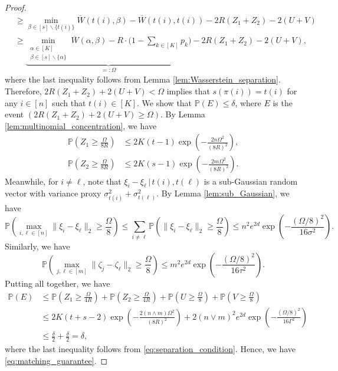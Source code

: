 \documentclass[11pt,letterpaper]{article}
\theoremstyle{definition}
\numberwithin{equation}{section}
\renewcommand{\P}{\mathbb{P}}
\begin{document}
\begin{proof}
\begin{equation}
\begin{split}
            & \ge \min_{\beta \in [s] \backslash \{t(i)\}} \overline{W}(t(i), \beta) - \overline{W}(t(i), t(i)) - 2 R (Z_1 + Z_2) - 2 (U + V) \\
            & \ge \underbrace{\min_{\substack{\alpha \in [K] \\ \beta \in [s] \backslash \{\alpha\}}} \overline{W}(\alpha, \beta) - R \cdot \bigg(1 - \sum_{k \in [K]} p_k \bigg)}_{=: \Omega} - 2 R (Z_1 + Z_2) - 2 (U + V),
        \end{split}
    \end{equation}
    where the last inequality follows from Lemma \ref{lem:Wasserstein_separation}. Therefore, $2 R (Z_1 + Z_2) + 2 (U + V) < \Omega$ implies that $s(\pi(i)) = t(i)$ for any $i \in [n]$ such that $t(i) \in [K]$. We show that $\P(E) \le \delta$, where $E$ is the event $(2 R (Z_1 + Z_2) + 2 (U + V) \ge \Omega)$. By Lemma \ref{lem:multinomial_concentration}, we have 
    \begin{align*}
        \P\left(Z_1 \ge \frac{\Omega}{8 R}\right) & \le 2 K (t - 1) \exp\left(-\frac{2 n \Omega^2}{(8 R)^2}\right), \\
        \P\left(Z_2 \ge \frac{\Omega}{8 R}\right) & \le 2 K (s - 1) \exp\left(-\frac{2 m \Omega^2}{(8 R)^2}\right).
    \end{align*}
    Meanwhile, for $i \neq \ell$, note that $\xi_i - \xi_\ell \, | \, t(i), t(\ell)$ is a sub-Gaussian random vector with variance proxy $\sigma_{t(i)}^2 + \sigma_{t(\ell)}^2$. By Lemma \ref{lem:sub_Gaussian}, we have
    \begin{equation*}
        \P\left(\max_{i, \ell \in [n]} \|\xi_i - \xi_\ell\|_2 \ge \frac{\Omega}{8}\right) \le \sum_{i \neq \ell} \P\left(\|\xi_i - \xi_\ell\|_2 \ge \frac{\Omega}{8}\right) \le n^2 e^{2 d} \exp\left(-\frac{(\Omega / 8)^2}{16 \sigma^2}\right).
    \end{equation*}
    Similarly, we have
    \begin{equation*}
        \P\left(\max_{j, \ell \in [m]} \|\zeta_j - \zeta_\ell\|_2 \ge \frac{\Omega}{8}\right) \le m^2 e^{2 d} \exp\left(-\frac{(\Omega / 8)^2}{16 \tau^2}\right). 
    \end{equation*}
    Putting all together, we have
    \begin{equation*}
        \begin{split}
            \P(E) 
            & \le \P\left(Z_1 \ge \frac{\Omega}{4 R}\right) + \P\left(Z_2 \ge \frac{\Omega}{4 R}\right) + \P\left(U \ge \frac{\Omega}{8}\right) + \P\left(V \ge \frac{\Omega}{8}\right) \\
            & \le 2 K (t + s - 2) \exp\left(-\frac{2 (n \wedge m) \Omega^2}{(8 R)^2}\right) + 2 (n \vee m)^2 e^{2 d} \exp\left(-\frac{(\Omega / 8)^2}{16 \Gamma^2}\right) \\
            & \le \frac{\delta}{2} + \frac{\delta}{2} = \delta,
        \end{split}        
    \end{equation*}
    where the last inequality follows from \eqref{eq:separation_condition}. Hence, we have \eqref{eq:matching_guarantee}.
\end{proof}
\end{document}
